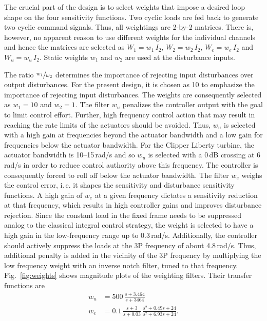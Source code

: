 \documentclass[times]{weauth}
\begin{document}
The crucial part of the design is to select weights that impose a desired loop shape on the four sensitivity functions. 
Two cyclic loads are fed back to generate two cyclic command signals. Thus, all weightings are 2-by-2 matrices. There is, however, no apparent reason to use different weights for the individual channels and hence the matrices are selected as $W_1 = w_1\,I_2$, $W_2 = w_2 \,I_2$, $W_e = w_e\,I_2$ and $W_u = w_u\,I_2$. Static weights $w_1$ and $w_2$ are used at the disturbance inputs. 

The ratio $\sfrac{w_1}{w_2}$ determines the importance of rejecting input disturbances over output disturbances. For the present design, it is chosen as 10 to emphasize the importance of rejecting input disturbances. The weights are consequently selected as $w_1 = 10$ and $w_2 = 1$.
%
The filter $w_u$ penalizes the controller output with the goal to limit control effort. Further, high frequency control action that may result in reaching the rate limits of the actuators should be avoided. Thus, $w_u$ is selected with a high gain at frequencies beyond the actuator bandwidth and a low gain for frequencies below the actuator bandwidth. For the Clipper Liberty turbine, the actuator bandwidth is 
10--15\,rad/s and so $w_u$ is selected with a 0\,dB crossing at 6\,rad/s in order to reduce control authority above this frequency.
The controller is consequently forced to roll off below the actuator bandwidth. 
The filter $w_e$ weighs the control error, i.\,e. it shapes the sensitivity and disturbance sensitivity functions. A high gain of $w_e$ at a given frequency dictates a sensitivity reduction at that frequency, which results in high controller gains and improves disturbance rejection.
%
Since the constant load in the fixed frame needs to be suppressed analog to the classical integral control strategy, the weight is selected to have a high gain in the low-frequency range up to 0.3\,rad/s. Additionally, the controller should actively suppress the loads at the 3P frequency of  about 4.8\,rad$/$s. Thus, additional penalty is added in the vicinity of the 3P frequency by multiplying the low frequency weight with an inverse notch filter, tuned to that frequency. Fig.~\ref{fig:weights} shows magnitude plots of the weighting filters.
Their transfer functions are
\begin{equation}
	\begin{split}
		w_u &= 500 \,\frac{s + 3.464}{s + 3464}\\
		w_e &= 0.1 \, \frac{s + 3}{s + 0.03} \, \frac{s^2 + 0.49s + 24}{s^2 + 6.93s + 24}.
	\end{split}
\end{equation}
\end{document}
